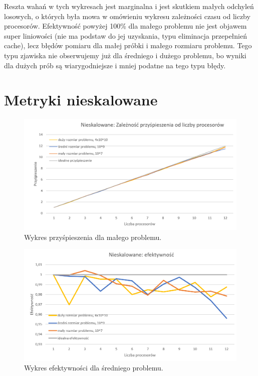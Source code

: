 \documentclass[10pt,english, openany]{book}
\begin{document}
Reszta wahań w tych wykresach jest marginalna i jest skutkiem małych odchyleń losowych, o których była mowa w omówieniu wykresu zależności czasu od liczby procesorów. Efektywność powyżej 100\% dla małego problemu nie jest objawem super liniowości (nie ma podstaw do jej uzyskania, typu eliminacja przepełnień cache), lecz błędów pomiaru dla małej próbki i małego rozmiaru problemu. Tego typu zjawiska nie obserwujemy już dla średniego i dużego problemu, bo wyniki dla dużych prób są wiarygodniejsze i mniej podatne na tego typu błędy.

\section{Metryki nieskalowane}

\begin{figure}[H]
\centering
\includegraphics[scale=0.9]{pics/Ns_speedup.png}
\caption{Wykres przyśpieszenia dla małego problemu.}
\end{figure}

\begin{figure}[H]
\centering
\includegraphics[scale=0.9]{pics/Ns_efekt.png}
\caption{Wykres efektywności dla średniego problemu.}
\end{figure}
\end{document}
